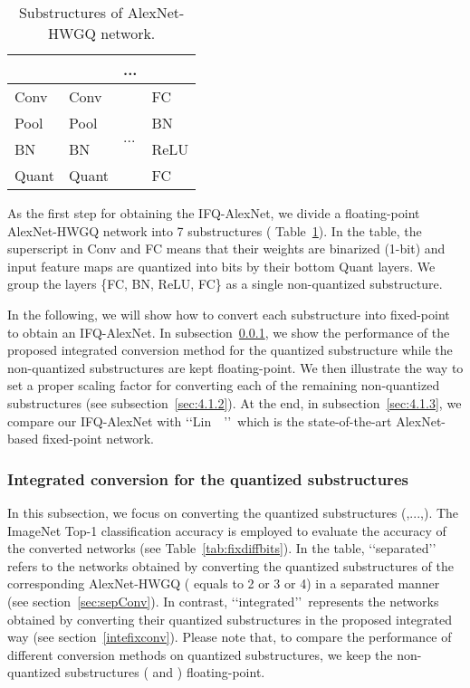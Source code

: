 \documentclass[10pt,twocolumn,letterpaper]{article}
\begin{document}
\begin{table}[!ht]
\centering
\caption{Substructures of AlexNet-HWGQ network.} \label{tab:AlexSubstructures}
\setlength{\tabcolsep}{2.0pt}
\begin{tabular}{p{}<{\centering}|p{}<{\centering}|p{}<{\centering}|p{}<{\centering}}
  \hline
         {} &{} & {...} &{} \\
  \hline\hline
         Conv          & Conv      &\multirow{4}{*}{...} &{FC} \\
         Pool          & Pool         &                     &{BN} \\
         BN            & BN           &                     &{ReLU}\\
         Quant         & Quant        &                     &{FC} \\
  \hline
\end{tabular}
\end{table}

As the first step for obtaining the IFQ-AlexNet, we divide a floating-point AlexNet-HWGQ network into 7 substructures ( Table~\ref{tab:AlexSubstructures}). In the table, the superscript  in Conv  and FC means that their weights are binarized (1-bit) and input feature maps are quantized into  bits by their bottom Quant layers. We group the layers \{FC, BN, ReLU, FC\} as a single non-quantized substructure.

In the following, we will show how to convert each substructure into fixed-point to obtain an IFQ-AlexNet. In subsection~\ref{sec:4.1.1}, we show the performance of the proposed integrated conversion method for the quantized substructure while the non-quantized substructures are kept floating-point. We then illustrate the way to set a proper scaling factor  for converting each of the remaining non-quantized substructures (see subsection~\ref{sec:4.1.2}).  At the end, in subsection~\ref{sec:4.1.3}, we compare our IFQ-AlexNet with \lq\lq Lin~\etal~\cite{LinFixPoint}\rq\rq\, which is the state-of-the-art AlexNet-based fixed-point network.



\subsubsection{Integrated conversion for the quantized substructures} \label{sec:4.1.1}

In this subsection, we focus on converting the quantized substructures (,...,). The ImageNet Top-1 classification accuracy is employed to evaluate the accuracy of the converted networks (see Table~\ref{tab:fixdiffbits}). In the table, \lq\lq separated\rq\rq\, refers to the networks obtained by converting the quantized substructures of the corresponding AlexNet-HWGQ ( equals to 2 or 3 or 4) in a separated manner (see section~\ref{sec:sepConv}). In contrast, \lq\lq integrated\rq\rq\, represents the networks obtained by converting their quantized substructures in the proposed integrated way (see section~\ref{intefixconv}). Please note that, to compare the performance of different conversion methods on quantized substructures, we keep the non-quantized substructures ( and ) floating-point.
\end{document}
